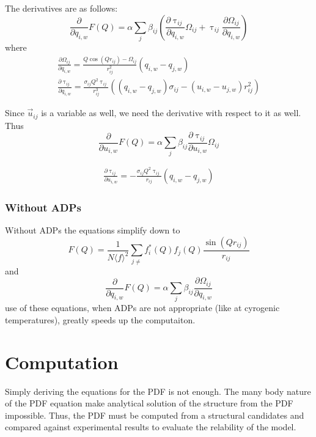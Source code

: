 \noindent The derivatives are as follows:
\begin{equation}
\frac{\partial}{\partial q_{i,w}} F{ (Q )} = \alpha \sum_{j} \beta_{ij} (\frac{\partial \uptau_{ij}}{\partial q_{i,w}}  \Omega_{ij} + \uptau_{ij} \frac{\partial \Omega_{ij}}{\partial q_{i,w}})
\end{equation}
where
\begin{eqnarray}
  \frac{\partial \Omega_{ij}}{\partial q_{i,w}}  = \frac{Q\cos(Qr_{ij}) - \Omega_{ij}}{r_{ij}^{2}} (q_{i,w}-q_{j,w})\\
  \frac{\partial \uptau_{ij}}{\partial q_{i,w}} = \frac{\sigma_{ij}Q^{2} \uptau_{ij}}{r_{ij}^{3}}   ((q_{i,w} - q_{j,w}) \sigma_{ij}- ( u_{i,w} - u_{j,w})r_{ij}^{2})
\end{eqnarray}

Since $\vec{u}_{ij}$ is a variable as well, we need the derivative with respect to it as well.
Thus
\begin{equation}
\frac{\partial}{\partial u_{i,w}} F{ (Q )} = \alpha \sum_{j} \beta_{ij} \frac{\partial \uptau_{ij}}{\partial u_{i,w}}  \Omega_{ij}
\end{equation}

\begin{eqnarray}
\frac{\partial \uptau_{ij}}{\partial u_{i,w}} =
- \frac{\sigma_{ij}Q^{2} \uptau_{ij}}{r_{ij}}  (q_{i,w} - q_{j,w})
\end{eqnarray}
\subsubsection{Without ADPs}
Without ADPs the equations simplify down to
\begin{equation}
F(Q) = \frac{1}{N \langle f \rangle^{2}} \sum_{j\neq} f_i^{*}(Q)f_j(Q) \frac{\sin(Qr_{ij})}{r_{ij}}
\end{equation}
and
 \begin{equation}
\frac{\partial}{\partial q_{i,w}} F{ (Q )} = \alpha \sum_{j} \beta_{ij} \frac{\partial \Omega_{ij}}{\partial q_{i,w}}
\end{equation}
use of these equations, when ADPs are not appropriate (like at cyrogenic temperatures), greatly speeds up the computaiton.

\section{Computation}
Simply deriving the equations for the PDF is not enough.
The many body nature of the PDF equation make analytical solution of the structure from the PDF impossible.
Thus, the PDF must be computed from a structural candidates and compared against experimental results to evaluate the relability of the model.


